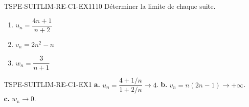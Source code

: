

\begin{exercice}{TSPE-SUITLIM-RE-C1-EX1}{1}{10}
Déterminer la limite de chaque suite.
\begin{enumerate}
  \item $u_n = \dfrac{4n+1}{n+2}$
  \item $v_n = 2n^2 - n$
  \item $w_n = \dfrac{3}{n+1}$
\end{enumerate}
\end{exercice}


\begin{corrige}{TSPE-SUITLIM-RE-C1-EX1}
\textbf{a.} $u_n = \dfrac{4+1/n}{1+2/n} \to 4$. \quad \textbf{b.} $v_n = n(2n-1) \to +\infty$. \quad \textbf{c.} $w_n \to 0$.
\end{corrige}
